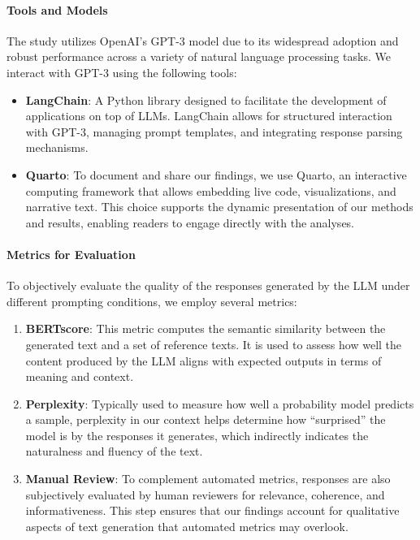 \documentclass[
]{agujournal2019}
\let\oldparagraph\paragraph
\renewcommand{\paragraph}[1]{\oldparagraph{#1}\mbox{}}
\begin{document}
\paragraph{Tools and Models}\label{tools-and-models}

The study utilizes OpenAI's GPT-3 model due to its widespread adoption
and robust performance across a variety of natural language processing
tasks. We interact with GPT-3 using the following tools:

\begin{itemize}
\item
  \textbf{LangChain}: A Python library designed to facilitate the
  development of applications on top of LLMs. LangChain allows for
  structured interaction with GPT-3, managing prompt templates, and
  integrating response parsing mechanisms.
\item
  \textbf{Quarto}: To document and share our findings, we use Quarto, an
  interactive computing framework that allows embedding live code,
  visualizations, and narrative text. This choice supports the dynamic
  presentation of our methods and results, enabling readers to engage
  directly with the analyses.
\end{itemize}

\paragraph{Metrics for Evaluation}\label{metrics-for-evaluation}

To objectively evaluate the quality of the responses generated by the
LLM under different prompting conditions, we employ several metrics:

\begin{enumerate}
\def\labelenumi{\arabic{enumi}.}
\item
  \textbf{BERTscore}: This metric computes the semantic similarity
  between the generated text and a set of reference texts. It is used to
  assess how well the content produced by the LLM aligns with expected
  outputs in terms of meaning and context.
\item
  \textbf{Perplexity}: Typically used to measure how well a probability
  model predicts a sample, perplexity in our context helps determine how
  ``surprised'' the model is by the responses it generates, which
  indirectly indicates the naturalness and fluency of the text.
\item
  \textbf{Manual Review}: To complement automated metrics, responses are
  also subjectively evaluated by human reviewers for relevance,
  coherence, and informativeness. This step ensures that our findings
  account for qualitative aspects of text generation that automated
  metrics may overlook.
\end{enumerate}
\end{document}
